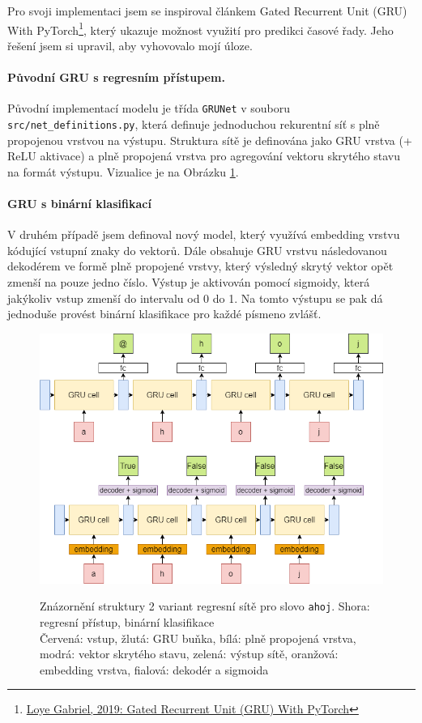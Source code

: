 \documentclass[a4paper]{article}
\theoremstyle{definition}
\begin{document}
Pro svoji implementaci jsem se inspiroval článkem Gated Recurrent Unit (GRU) With PyTorch\footnote{\href{https://blog.floydhub.com/gru-with-pytorch/}{Loye Gabriel, 2019: Gated Recurrent Unit (GRU) With PyTorch}}, který ukazuje možnost využití pro predikci časové řady. Jeho řešení jsem si upravil, aby vyhovovalo mojí úloze.

\paragraph{Původní GRU s regresním přístupem.}

Původní implementací modelu je třída \texttt{GRUNet} v souboru \texttt{src/net\_definitions.py}, která definuje jednoduchou rekurentní síť s plně propojenou vrstvou na výstupu. Struktura sítě je definována jako GRU vrstva (+ ReLU aktivace) a plně propojená vrstva pro agregování vektoru skrytého stavu na formát výstupu. Vizualice je na Obrázku \ref{png:gru_old_adresa}.

\paragraph{GRU s binární klasifikací}

V druhém případě jsem definoval nový model, který využívá embedding vrstvu kódující vstupní znaky do vektorů. Dále obsahuje GRU vrstvu následovanou dekodérem ve formě plně propojené vrstvy, který výsledný skrytý vektor opět zmenší na pouze jedno číslo. Výstup je aktivován pomocí sigmoidy, která jakýkoliv vstup zmenší do intervalu od 0 do 1. Na tomto výstupu se pak dá jednoduše provést binární klasifikace pro každé písmeno zvlášť.


\begin{figure}[t!]
  \centering
  \includegraphics[width=5in]{docs/gru_both_ahoj.png}\\[1pt]
  \caption{Znázornění struktury 2 variant regresní sítě pro slovo \texttt{ahoj}. Shora: regresní přístup, binární klasifikace\\Červená: vstup, žlutá: GRU buňka, bílá: plně propojená vrstva, modrá: vektor skrytého stavu, zelená: výstup sítě, oranžová: embedding vrstva, fialová: dekodér a sigmoida}
  \label{png:gru_old_adresa}
\end{figure}
\end{document}
